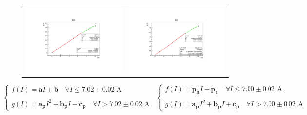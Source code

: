 \documentclass[a4paper,12pt,abstracton]{scrartcl}
\begin{document}
\begin{figure}[H]\hspace{-0.8cm}
    \begin{tabular}{c c}
      \includegraphics[scale=0.46]{plots/BIcre1.pdf}  &\hspace{0.1cm} \includegraphics[scale=0.46]{plots/BIdec1.pdf} \\
      \end{tabular}
    \caption{}
    \label{fig:BI1}
\end{figure}
$$
\begin{cases}
f(I)=\boldsymbol{a} I + \boldsymbol{b} \quad \forall I \leq 7.02 \pm 0.02 \text{ A} \\ \\
g(I)= \boldsymbol{a_p}I^2 + \boldsymbol{b_p}I + \boldsymbol{c_p} \quad \forall I > 7.02 \pm 0.02 \text{ A}
\end{cases}
\;\;
\begin{cases}
f(I)=\boldsymbol{p_0} I + \boldsymbol{p_1} \quad \forall I \leq 7.00 \pm 0.02 \text{ A} \\ \\
g(I)= \boldsymbol{a_p}I^2 + \boldsymbol{b_p}I + \boldsymbol{c_p} \quad \forall I > 7.00 \pm 0.02 \text{ A}
\end{cases}
$$
\end{document}
